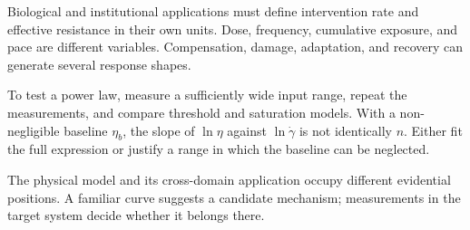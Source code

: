 Biological and institutional applications must define intervention rate and effective resistance in their own units. Dose, frequency, cumulative exposure, and pace are different variables. Compensation, damage, adaptation, and recovery can generate several response shapes.

To test a power law, measure a sufficiently wide input range, repeat the measurements, and compare threshold and saturation models. With a non-negligible baseline $\eta_b$, the slope of $\ln\eta$ against $\ln\dot\gamma$ is not identically $n$. Either fit the full expression or justify a range in which the baseline can be neglected.

The physical model and its cross-domain application occupy different evidential positions. A familiar curve suggests a candidate mechanism; measurements in the target system decide whether it belongs there.

